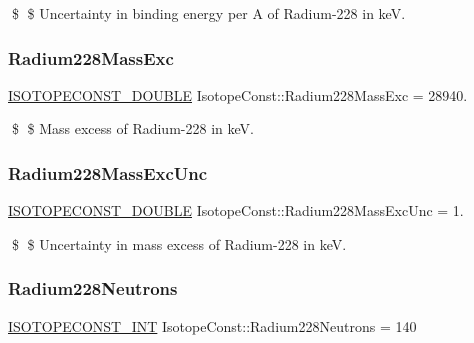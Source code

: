 \$ \$ Uncertainty in binding energy per A of Radium-\/228 in keV. \mbox{\label{group___isotope_const-_radium-_ra228_ga0387261ba59385f2b7cadbd030e4d911}} 
\subsubsection{\texorpdfstring{Radium228\+Mass\+Exc}{Radium228MassExc}}
{\footnotesize\ttfamily \mbox{\hyperlink{group___isotope_const-_macros_ga8f45a7272ce02c0b4c65c44636ed719a}{I\+S\+O\+T\+O\+P\+E\+C\+O\+N\+S\+T\+\_\+\+D\+O\+U\+B\+LE}} Isotope\+Const\+::\+Radium228\+Mass\+Exc = 28940.}

\$ \$ Mass excess of Radium-\/228 in keV. \mbox{\label{group___isotope_const-_radium-_ra228_gaa6e19ba97be9c4aeff002f59458f9a80}} 
\subsubsection{\texorpdfstring{Radium228\+Mass\+Exc\+Unc}{Radium228MassExcUnc}}
{\footnotesize\ttfamily \mbox{\hyperlink{group___isotope_const-_macros_ga8f45a7272ce02c0b4c65c44636ed719a}{I\+S\+O\+T\+O\+P\+E\+C\+O\+N\+S\+T\+\_\+\+D\+O\+U\+B\+LE}} Isotope\+Const\+::\+Radium228\+Mass\+Exc\+Unc = 1.}

\$ \$ Uncertainty in mass excess of Radium-\/228 in keV. \mbox{\label{group___isotope_const-_radium-_ra228_ga63fa8a54b55d65deaf7cd3132d63a1a9}} 
\subsubsection{\texorpdfstring{Radium228\+Neutrons}{Radium228Neutrons}}
{\footnotesize\ttfamily \mbox{\hyperlink{group___isotope_const-_macros_ga5f18360b3e99483a35c32d789e62621c}{I\+S\+O\+T\+O\+P\+E\+C\+O\+N\+S\+T\+\_\+\+I\+NT}} Isotope\+Const\+::\+Radium228\+Neutrons = 140}

